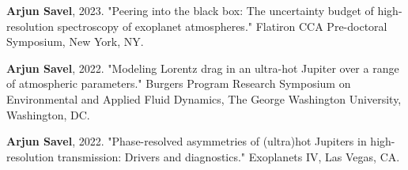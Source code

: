 \documentclass[letterpaper,11.5pt]{article}
\newcommand{\shorterSection}[1]{\vspace{-10pt}\section{#1}}
\begin{document}
\small
  \begin{list}{}{\cvlist}
  

  \item[{\color{numcolor}\scriptsize3}] \textbf{Arjun Savel}, 2023. "Peering into the black box: 
The uncertainty budget of high-resolution spectroscopy of exoplanet atmospheres." Flatiron CCA Pre-doctoral Symposium, New York, NY.


  \item[{\color{numcolor}\scriptsize2}] \textbf{Arjun Savel}, 2022. "Modeling Lorentz drag in an ultra-hot Jupiter over a range of atmospheric parameters." Burgers Program Research Symposium on Environmental and Applied Fluid Dynamics, The George Washington University, Washington, DC.

     \item[{\color{numcolor}\scriptsize1}] \textbf{Arjun Savel}, 2022. "Phase-resolved asymmetries of (ultra)hot Jupiters in high-resolution transmission: Drivers and diagnostics." Exoplanets IV, Las Vegas, CA.





\end{list}



\end{document}
